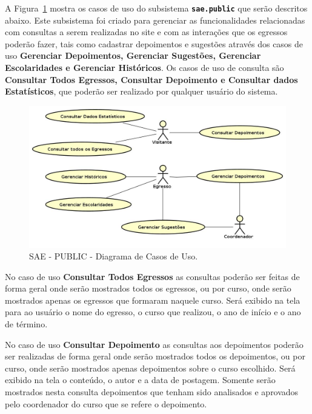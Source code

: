 A Figura~\ref{fig-requisitos-public-diagrama-casos-uso} mostra os casos de uso do subsistema \textbf{\texttt{sae.public}} que serão descritos abaixo. Este subsistema foi criado para gerenciar as funcionalidades relacionadas com consultas a serem realizadas no site e com as interações que os egressos poderão fazer, tais como cadastrar depoimentos e sugestões através dos casos de uso \textbf{Gerenciar Depoimentos, Gerenciar Sugestões, Gerenciar Escolaridades e Gerenciar Históricos}. Os casos de uso de consulta são \textbf{Consultar Todos Egressos, Consultar Depoimento e Consultar dados Estatísticos}, que poderão ser realizado por qualquer usuário do sistema. 

\begin{figure}[!h]
	\centering
	\includegraphics[width=1\textwidth]{figuras/requisitos/casodeuso-public}
	\caption{SAE - PUBLIC - Diagrama de Casos de Uso.}
	\label{fig-requisitos-public-diagrama-casos-uso}
\end{figure}

No caso de uso \textbf{Consultar Todos Egressos} as consultas poderão ser feitas de forma geral onde serão mostrados todos os egressos, ou por curso, onde serão mostrados apenas os egressos que formaram naquele curso. Será exibido na tela para ao usuário o nome do egresso, o curso que realizou, o ano de início e o ano de término.

No caso de uso \textbf{Consultar Depoimento} as consultas aos depoimentos poderão ser realizadas de forma geral onde serão mostrados todos os depoimentos, ou por curso, onde serão mostrados apenas depoimentos sobre o curso escolhido. Será exibido na tela o conteúdo, o autor e a data de postagem. Somente serão mostrados nesta consulta depoimentos que tenham sido analisados e aprovados pelo coordenador do curso que se refere o depoimento.

